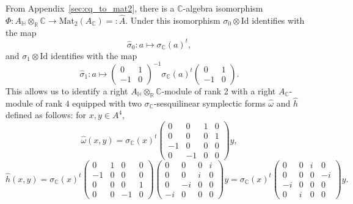 \documentclass[oneside,11pt]{amsart}
\theoremstyle{definition}
\theoremstyle{remark}
\numberwithin{thm}{section}
\numberwithin{equation}{section}
\begin{document}
From Appendix~\ref{sec:cq_to_mat2}, there is a $\mathbb C$-algebra isomorphism $\Phi\colon A_\mathbb H\otimes_\mathbb R\mathbb C\to \mathrm{Mat}_2(A_\mathbb C)=:\hat A$. Under this isomorphism $\sigma_0\otimes\mathrm{Id}$ identifies with the map 
$$\hat\sigma_0\colon a\mapsto \sigma_\mathbb C(a)^t,$$
and $\sigma_1\otimes\mathrm{Id}$ identifies with the map 
$$\hat\sigma_1\colon a\mapsto \begin{pmatrix}
0 & 1 \\
-1 & 0
\end{pmatrix}^{-1}\sigma_\mathbb C(a)^t\begin{pmatrix}
0 & 1 \\
-1 & 0
\end{pmatrix}.$$
This allows us to identify a right $A_\mathbb H\otimes_\mathbb R\mathbb C$-module of rank 2 with a right $A_\mathbb C$-module of rank $4$ equipped with two $\sigma_\mathbb C$-sesquilinear symplectic forms $\hat\omega$ and $\hat h$ defined as follows: for $x,y\in A^4$,
$$\hat\omega(x,y)=\sigma_\mathbb C(x)^t\begin{pmatrix}
    0 & 0 & 1 & 0\\
    0 & 0 & 0 & 1\\
    -1 & 0 & 0 & 0\\
    0 & -1 & 0 & 0
\end{pmatrix}y,$$
$$\hat h(x,y)=\sigma_\mathbb C(x)^t\begin{pmatrix}
    0 & 1 & 0 & 0\\
    -1 &  0 & 0 & 0\\
    0 & 0 & 0 & 1\\
    0 & 0 & -1 & 0
\end{pmatrix}\begin{pmatrix}
    0 & 0 & 0 & i\\
    0 & 0 & i & 0\\
    0 & -i & 0 & 0\\
    -i & 0 & 0 & 0
\end{pmatrix}y=\sigma_\mathbb C(x)^t\begin{pmatrix}
    0 & 0 & i & 0\\
    0 & 0 & 0 & -i\\
    -i & 0 & 0 & 0\\
    0 & i & 0 & 0
\end{pmatrix}y.$$
\end{document}
